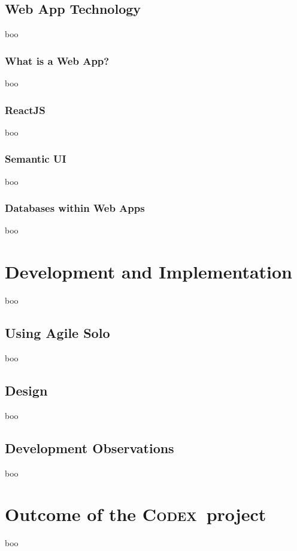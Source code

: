 \documentclass[final]{cmpreport}
\newcommand{\Codex}{\textsc{Codex}}
\begin{document}
		\subsection{Web App Technology} \label{sec:web-app}
		boo
		
			\subsubsection{What is a Web App?} \label{sec:what-web-app}
			boo
				
			\subsubsection{ReactJS} \label{sec:react-js}
			boo
			
			\subsubsection{Semantic UI} \label{sec:semantic-ui}
			boo
			
			\subsubsection{Databases within Web Apps} \label{sec:databases}
			boo
			
	\section{Development and Implementation} \label{sec:dev-and-imp}
	boo
	
		\subsection{Using Agile Solo} \label{sec:use-agile-solo}
		boo
			
		\subsection{Design} \label{sec:design}
		boo
		
		\subsection{Development Observations} \label{sec:dev-obs}
		boo
		
	\section{Outcome of the \Codex \ project} \label{sec:outcomes}
	boo
	
\end{document}
